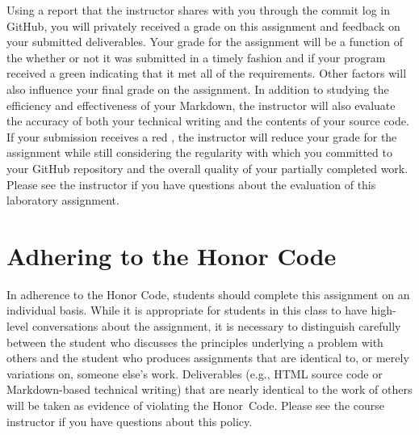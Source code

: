 \documentclass[11pt]{article}
\newcommand{\checkmark}{\ding{51}}
\newcommand{\naughtmark}{\ding{55}}
\begin{document}
Using a report that the instructor shares with you through the commit log in GitHub, you will privately received a grade
on this assignment and feedback on your submitted deliverables. Your grade for the assignment will be a function of the
whether or not it was submitted in a timely fashion and if your program received a green \checkmark{} indicating that it
met all of the requirements. Other factors will also influence your final grade on the assignment. In addition to
studying the efficiency and effectiveness of your Markdown, the instructor will also evaluate the accuracy of both your
technical writing and the contents of your source code. If your submission receives a red \naughtmark{}, the instructor
will reduce your grade for the assignment while still considering the regularity with which you committed to your GitHub
repository and the overall quality of your partially completed work. Please see the instructor if you have questions
about the evaluation of this laboratory assignment.

\section*{Adhering to the Honor Code}

In adherence to the Honor Code, students should complete this assignment on an individual basis. While it is appropriate
for students in this class to have high-level conversations about the assignment, it is necessary to distinguish
carefully between the student who discusses the principles underlying a problem with others and the student who produces
assignments that are identical to, or merely variations on, someone else's work. Deliverables (e.g., HTML source code or
Markdown-based technical writing) that are nearly identical to the work of others will be taken as evidence of violating
the \mbox{Honor Code}. Please see the course instructor if you have questions about this policy.
\end{document}
